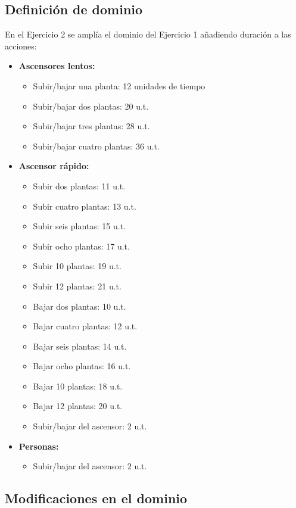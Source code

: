 \documentclass{article}
\begin{document}
\subsection{Definición de dominio}
En el Ejercicio 2 se amplía el dominio del Ejercicio 1 añadiendo duración 
a las acciones:
\begin{itemize}
    \item \textbf{Ascensores lentos:}
    \begin{itemize}
        \item Subir/bajar una planta: 12 unidades de tiempo
        \item Subir/bajar dos plantas: 20 u.t.
        \item Subir/bajar tres plantas: 28 u.t.
        \item Subir/bajar cuatro plantas: 36 u.t.
    \end{itemize}
    \item \textbf{Ascensor rápido:}
    \begin{itemize}
        \item Subir dos plantas: 11 u.t.
        \item Subir cuatro plantas: 13 u.t.
        \item Subir seis plantas: 15 u.t.
        \item Subir ocho plantas: 17 u.t.
        \item Subir 10 plantas: 19 u.t.
        \item Subir 12 plantas: 21 u.t.
        \item Bajar dos plantas: 10 u.t.
        \item Bajar cuatro plantas: 12 u.t.
        \item Bajar seis plantas: 14 u.t.
        \item Bajar ocho plantas: 16 u.t.
        \item Bajar 10 plantas: 18 u.t.
        \item Bajar 12 plantas: 20 u.t.
        \item Subir/bajar del ascensor: 2 u.t.
    \end{itemize}
    \item \textbf{Personas:}
    \begin{itemize}
        \item Subir/bajar del ascensor: 2 u.t.
    \end{itemize}
\end{itemize}

\subsection{Modificaciones en el dominio}
\end{document}
